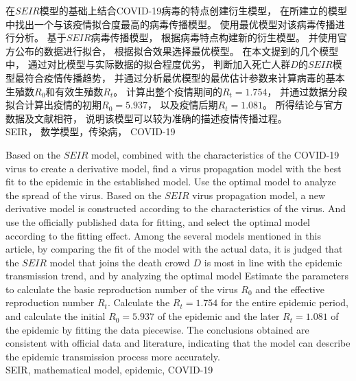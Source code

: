 \begin{cnabstract}
    \songti {}
    在$SEIR$模型的基础上结合COVID-19病毒的特点创建衍生模型，
    在所建立的模型中找出一个与该疫情拟合度最高的病毒传播模型。
    使用最优模型对该病毒传播进行分析。
    基于$SEIR$病毒传播模型，
    根据病毒特点构建新的衍生模型。
    并使用官方公布的数据进行拟合，
    根据拟合效果选择最优模型。
    在本文提到的几个模型中，
    通过对比模型与实际数据的拟合程度优劣，
    判断加入死亡人群$D$的$SEIR$模型最符合疫情传播趋势，
    并通过分析最优模型的最优估计参数来计算病毒的基本生殖数$R_0$和有效生殖数$R_t$。
    计算出整个疫情期间的$R_t=1.754$，
    并通过数据分段拟合计算出疫情的初期$R_0=5.937$，
    以及疫情后期$R_t=1.081$。
    所得结论与官方数据及文献相符，
    说明该模型可以较为准确的描述疫情传播过程。
    \\
     SEIR， 数学模型，传染病， COVID-19
\end{cnabstract}
\begin{enabstract}
    Based on the $ SEIR $ model,
    combined with the characteristics of the COVID-19 virus to create a derivative model,
    find a virus propagation model with the best fit to the epidemic in the established model.
    Use the optimal model to analyze the spread of the virus.
    Based on the $ SEIR $ virus propagation model,
    a new derivative model is constructed according to the characteristics of the virus.
    And use the officially published data for fitting,
    and select the optimal model according to the fitting effect.
    Among the several models mentioned in this article,
    by comparing the fit of the model with the actual data,
    it is judged that the $ SEIR $ model that joins the death crowd $ D $ is most in line with the epidemic transmission trend,
    and by analyzing the optimal model Estimate the parameters to calculate the basic reproduction number of the virus $ R_0 $ and the effective reproduction number $ R_t $.
    Calculate the $ R_t = 1.754 $ for the entire epidemic period,
    and calculate the initial $ R_0 = 5.937 $ of the epidemic and the later $ R_t = 1.081 $ of the epidemic by fitting the data piecewise.
    The conclusions obtained are consistent with official data and literature,
    indicating that the model can describe the epidemic transmission process more accurately.
    \\
     SEIR, mathematical model, epidemic, COVID-19
\end{enabstract}